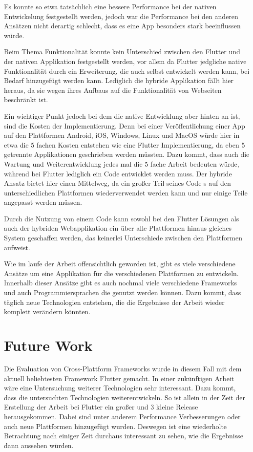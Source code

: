 Es konnte so etwa tatsächlich eine bessere Performance bei der nativen Entwickelung festgestellt werden, jedoch war die Performance bei den anderen Ansätzen nicht derartig schlecht, dass es eine App besonders stark beeinflussen würde. 

Beim Thema Funktionalität konnte kein Unterschied zwischen den Flutter und der nativen Applikation festgestellt werden, vor allem da Flutter jedgliche native Funktionalität durch ein Erweiterung, die auch selbst entwickelt werden kann, bei Bedarf hinzugefügt werden kann. Lediglich die hybride Applikation fällt hier heraus, da sie wegen ihres Aufbaus auf die Funktionalität von Webseiten beschränkt ist.

Ein wichtiger Punkt jedoch bei dem die native Entwicklung aber hinten an ist, sind die Kosten der Implementierung. Denn bei einer Veröffentlichung einer App auf den Plattformen Android, iOS, Windows, Linux und MacOS würde hier in etwa die 5 fachen Kosten entstehen wie eine Flutter Implementierung, da eben 5 getrennte Applikationen geschrieben werden müssten. Dazu kommt, dass auch die Wartung und Weiterentwicklung jedes mal die 5 fache Arbeit bedeuten würde, während bei Flutter lediglich ein Code entwicklet werden muss. Der hybride Ansatz bietet hier einen Mittelweg, da ein großer Teil seines Code s auf den unterschiedlichen Plattformen wiederverwendet werden kann und nur einige Teile angepasst werden müssen. 

Durch die Nutzung von einem Code kann sowohl bei den Flutter Lösungen als auch der hybriden Webapplikation ein über alle Plattformen hinaus gleiches System geschaffen werden, das keinerlei Unterschiede zwischen den Plattformen aufweist. 


Wie im laufe der Arbeit offensichtlich geworden ist, gibt es viele verschiedene Ansätze um eine Applikation für die verschiedenen Plattformen zu entwickeln. Innerhalb dieser Ansätze gibt es auch nochmal viele verschiedene Frameworks und auch Programmiersprachen die genutzt werden können. Dazu kommt, dass täglich neue Technologien entstehen, die die Ergebnisse der Arbeit wieder komplett verändern könnten.




\section{Future Work}
Die Evaluation von Cross-Plattform Frameworks wurde in diesem Fall mit dem aktuell beliebtesten Framework Flutter gemacht. In einer zukünftigen Arbeit wäre eine Untersuchung weiterer Technologien sehr interessant. Dazu kommt, dass die untersuchten Technologien weiterentwickeln. So ist allein in der Zeit der Erstellung der Arbeit bei Flutter ein großer und 3 kleine Release herausgekommen. Dabei sind unter anderem Performance Verbesserungen oder auch neue Plattformen hinzugefügt wurden. Deswegen ist eine wiederholte Betrachtung nach einiger Zeit durchaus interessant zu sehen, wie die Ergebnisse dann aussehen würden.

